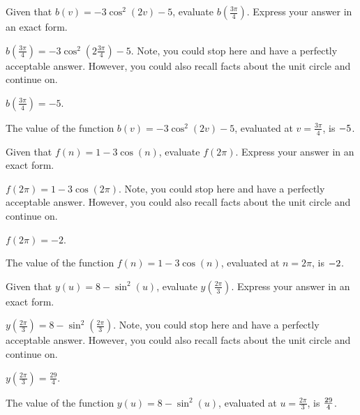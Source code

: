 \begin{shuffle}
\begin{exercise}
Given that $b(v)=-3 \cos ^2(2 v)-5$, evaluate $b\left(\frac{3 \pi }{4}\right)$. Express your answer in an exact form.
\begin{solution}
\begin{hint}
$b\left(\frac{3 \pi }{4}\right)=-3 \cos ^2\left(2 \frac{3 \pi }{4}\right)-5$. Note, you could stop here and have a perfectly acceptable answer. However, you could also recall facts about the unit circle and continue on. 
\end{hint}
\begin{hint}
$b\left(\frac{3 \pi }{4}\right)=-5$.
\end{hint}
The value of the function $b(v)=-3 \cos ^2(2 v)-5$, evaluated at $v=\frac{3 \pi }{4}$, is ${-5}$.
\end{solution}
\end{exercise}

\begin{exercise}
Given that $f(n)=1-3 \cos (n)$, evaluate $f\left(2 \pi\right)$. Express your answer in an exact form.
\begin{solution}
\begin{hint}
$f\left(2 \pi\right)=1-3 \cos \left(2 \pi\right)$. Note, you could stop here and have a perfectly acceptable answer. However, you could also recall facts about the unit circle and continue on. 
\end{hint}
\begin{hint}
$f\left(2 \pi\right)=-2$.
\end{hint}
The value of the function $f(n)=1-3 \cos (n)$, evaluated at $n=2 \pi$, is ${-2}$.
\end{solution}
\end{exercise}

\begin{exercise}
Given that $y(u)=8-\sin ^2(u)$, evaluate $y\left(\frac{2 \pi }{3}\right)$. Express your answer in an exact form.
\begin{solution}
\begin{hint}
$y\left(\frac{2 \pi }{3}\right)=8-\sin ^2\left(\frac{2 \pi }{3}\right)$. Note, you could stop here and have a perfectly acceptable answer. However, you could also recall facts about the unit circle and continue on. 
\end{hint}
\begin{hint}
$y\left(\frac{2 \pi }{3}\right)=\frac{29}{4}$.
\end{hint}
The value of the function $y(u)=8-\sin ^2(u)$, evaluated at $u=\frac{2 \pi }{3}$, is ${\frac{29}{4}}$.
\end{solution}
\end{exercise}


\end{shuffle}
